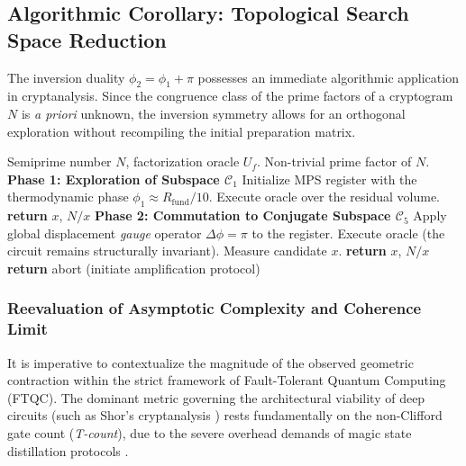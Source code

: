 \documentclass[12pt,a4paper]{article}
\theoremstyle{plain}
\theoremstyle{definition}
\theoremstyle{remark}
\begin{document}
\subsection{Algorithmic Corollary: Topological Search Space Reduction}
\label{subsec:estrategia_adaptativa}

The inversion duality $\phi_2 = \phi_1 + \pi$ possesses an immediate algorithmic application in cryptanalysis. Since the congruence class of the prime factors of a cryptogram $N$ is \textit{a priori} unknown, the inversion symmetry allows for an orthogonal exploration without recompiling the initial preparation matrix.

\begin{algorithm}[H]
\caption{Modular Search Adaptive Strategy (MST)}
\label{alg:estrategia}
\begin{algorithmic}[1]
\Require Semiprime number $N$, factorization oracle $U_f$.
\Ensure Non-trivial prime factor of $N$.
\Statex
\State \textbf{Phase 1: Exploration of Subspace $\mathcal{C}_1$}
\State Initialize MPS register with the thermodynamic phase $\phi_1 \approx R_{\text{fund}}/10$.
\State Execute oracle over the residual volume.
    \State \textbf{return} $x$, $N/x$
\EndIf
\Statex
\State \textbf{Phase 2: Commutation to Conjugate Subspace $\mathcal{C}_5$}
\State Apply global displacement \textit{gauge} operator $\Delta\phi = \pi$ to the register.
\State Execute oracle (the circuit remains structurally invariant).
\State Measure candidate $x$.
    \State \textbf{return} $x$, $N/x$
\Else
    \State \textbf{return} abort (initiate amplification protocol)
\EndIf
\end{algorithmic}
\end{algorithm}

\subsubsection*{Reevaluation of Asymptotic Complexity and Coherence Limit}

It is imperative to contextualize the magnitude of the observed geometric contraction within the strict framework of Fault-Tolerant Quantum Computing (FTQC). The dominant metric governing the architectural viability of deep circuits (such as Shor's cryptanalysis \cite{Shor1994}) rests fundamentally on the non-Clifford gate count (\textit{T-count}), due to the severe overhead demands of magic state distillation protocols \cite{Gidney2021}.
\end{document}
